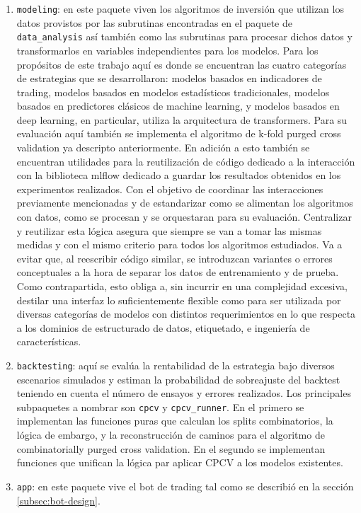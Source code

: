 \begin{enumerate}
\item \texttt{modeling}: en este paquete viven los algoritmos de inversión que utilizan los datos provistos por las subrutinas encontradas en el paquete de \texttt{data\_analysis} así también como las subrutinas para procesar dichos datos y transformarlos en variables independientes para los modelos.  Para los propósitos de este trabajo aquí es donde se encuentran las cuatro categorías de estrategias que se desarrollaron: modelos basados en indicadores de trading, modelos basados en modelos estadísticos tradicionales, modelos basados en predictores clásicos de machine learning, y modelos basados en deep learning, en particular, utiliza la arquitectura de transformers.
  Para su evaluación aquí también se implementa el algoritmo de k-fold purged cross validation  ya descripto anteriormente. En adición a esto también se encuentran utilidades para la reutilización de código dedicado a la interacción con la biblioteca mlflow dedicado a guardar los resultados obtenidos en los experimentos realizados.
  Con el objetivo de coordinar las interacciones previamente mencionadas y de estandarizar como se alimentan los algoritmos con datos, como se procesan y se orquestaran para su evaluación. Centralizar y reutilizar esta lógica asegura que siempre se van a tomar las mismas medidas y con el mismo criterio para todos los algoritmos estudiados. Va a evitar que, al reescribir código similar, se introduzcan variantes o errores conceptuales a la hora de separar los datos de entrenamiento y de prueba. Como contrapartida, esto obliga a, sin incurrir en una complejidad excesiva, destilar  una interfaz lo suficientemente flexible como para ser utilizada por diversas categorías de modelos con distintos requerimientos en lo que respecta a los dominios de estructurado de datos, etiquetado, e ingeniería de características.
\item \texttt{backtesting}:  aquí se evalúa la rentabilidad de la estrategia bajo diversos escenarios simulados y estiman la probabilidad de sobreajuste del backtest teniendo en cuenta el número de ensayos y errores realizados. Los principales subpaquetes a nombrar son \texttt{cpcv} y \texttt{cpcv\_runner}. En el primero se implementan las funciones puras que calculan los splits combinatorios, la lógica de embargo, y la reconstrucción de caminos para el algoritmo de combinatorially purged cross validation. En el segundo se implementan funciones que unifican la lógica par aplicar CPCV a los modelos existentes.

\item \texttt{app}: en este paquete vive el bot de trading tal como se describió en la sección \ref{subsec:bot-design}.
\end{enumerate}


